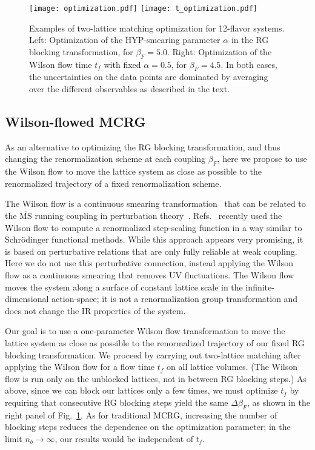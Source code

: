\documentclass{PoS}
\newcommand{\al}{\ensuremath{\alpha} }
\newcommand{\be}{\ensuremath{\beta} }
\newcommand{\De}{\ensuremath{\Delta} }
\newcommand{\MSbar}{\ensuremath{\overline{\textrm{MS}}} }
\newcommand{\fig}[1]{Fig.~\ref{#1}}
\begin{document}
\begin{figure}[htpb]
  \centering
  \texttt{[image: optimization.pdf]}\hfill
  \texttt{[image: t\_optimization.pdf]}
  \caption{Examples of two-lattice matching optimization for 12-flavor systems.  Left: Optimization of the HYP-smearing parameter \al in the RG blocking transformation, for $\be_F = 5.0$.  Right: Optimization of the Wilson flow time $t_f$ with fixed $\al = 0.5$, for $\be_F = 4.5$.  In both cases, the uncertainties on the data points are dominated by averaging over the different observables as described in the text.}
  \label{fig:opt}
\end{figure}



\subsection{\label{sec:WMCRG}Wilson-flowed MCRG} %
As an alternative to optimizing the RG blocking transformation, and thus changing the renormalization scheme at each coupling $\be_F$, here we propose to use the Wilson flow to move the lattice system as close as possible to the renormalized trajectory of a fixed renormalization scheme.

The Wilson flow is a continuous smearing transformation~\cite{Narayanan:2006rf} that can be related to the \MSbar running coupling in perturbation theory~\cite{Luscher:2010iy}.
Refs.~\cite{Fodor:2012td, Fodor:2012qh} recently used the Wilson flow to compute a renormalized step-scaling function in a way similar to Schr\"odinger functional methods.
While this approach appears very promising, it is based on perturbative relations that are only fully reliable at weak coupling.
Here we do not use this perturbative connection, instead applying the Wilson flow as a continuous smearing that removes UV fluctuations.
The Wilson flow moves the system along a surface of constant lattice scale in the infinite-dimensional action-space; it is not a renormalization group transformation and does not change the IR properties of the system.

Our goal is to use a one-parameter Wilson flow transformation to move the lattice system as close as possible to the renormalized trajectory of our fixed RG blocking transformation.
We proceed by carrying out two-lattice matching after applying the Wilson flow for a flow time $t_f$ on all lattice volumes.
(The Wilson flow is run only on the unblocked lattices, not in between RG blocking steps.)
As above, since we can block our lattices only a few times, we must optimize $t_f$ by requiring that consecutive RG blocking steps yield the same $\De\be_F$, as shown in the right panel of \fig{fig:opt}.
As for traditional MCRG, increasing the number of blocking steps reduces the dependence on the optimization parameter; in the limit $n_b \to \infty$, our results would be independent of $t_f$.
\end{document}
